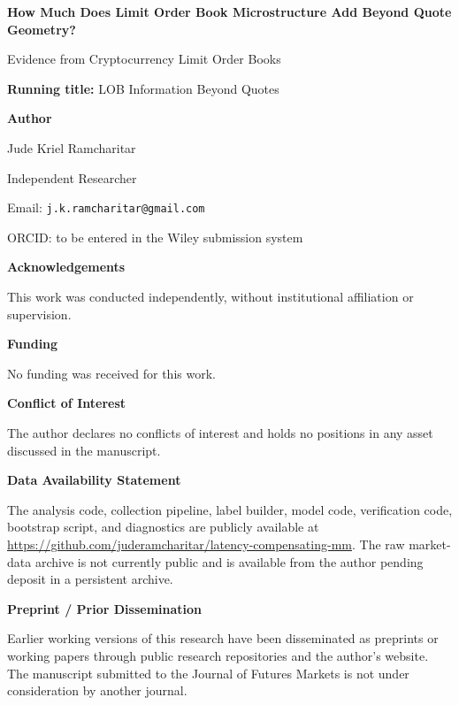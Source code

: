 \documentclass[11pt]{article}
\begin{document}
\begin{center}
{\Large\bfseries How Much Does Limit Order Book Microstructure Add Beyond Quote Geometry?}\par
\vspace{0.3em}
{\large Evidence from Cryptocurrency Limit Order Books}\par
\vspace{1em}
\textbf{Running title:} LOB Information Beyond Quotes
\end{center}

\vspace{1.5em}
\noindent\textbf{Author}\par
Jude Kriel Ramcharitar\par
Independent Researcher\par
Email: \texttt{j.k.ramcharitar@gmail.com}\par
ORCID: to be entered in the Wiley submission system\par

\vspace{1em}
\noindent\textbf{Acknowledgements}\par
This work was conducted independently, without institutional affiliation or supervision.

\vspace{1em}
\noindent\textbf{Funding}\par
No funding was received for this work.

\vspace{1em}
\noindent\textbf{Conflict of Interest}\par
The author declares no conflicts of interest and holds no positions in any asset discussed in the manuscript.

\vspace{1em}
\noindent\textbf{Data Availability Statement}\par
The analysis code, collection pipeline, label builder, model code, verification code, bootstrap script, and diagnostics are publicly available at \url{https://github.com/juderamcharitar/latency-compensating-mm}. The raw market-data archive is not currently public and is available from the author pending deposit in a persistent archive.

\vspace{1em}
\noindent\textbf{Preprint / Prior Dissemination}\par
Earlier working versions of this research have been disseminated as preprints or working papers through public research repositories and the author's website. The manuscript submitted to the Journal of Futures Markets is not under consideration by another journal.
\end{document}

